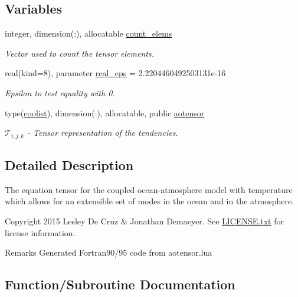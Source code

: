 \subsection*{Variables}
\begin{DoxyCompactItemize}
\item 
integer, dimension(\+:), allocatable \hyperlink{namespaceaotensor__def_aa9e30c84efc5a81409ba9c0286c87eac}{count\+\_\+elems}
\begin{DoxyCompactList}\small\item\em Vector used to count the tensor elements. \end{DoxyCompactList}\item 
real(kind=8), parameter \hyperlink{namespaceaotensor__def_ab1cf9313fb1def1a17de539cfa922e35}{real\+\_\+eps} = 2.\+2204460492503131e-\/16
\begin{DoxyCompactList}\small\item\em Epsilon to test equality with 0. \end{DoxyCompactList}\item 
type(\hyperlink{structtensor_1_1coolist}{coolist}), dimension(\+:), allocatable, public \hyperlink{namespaceaotensor__def_a0dc43bc9294a18f2fe57b67489f1702f}{aotensor}
\begin{DoxyCompactList}\small\item\em $\mathcal{T}_{i,j,k}$ -\/ Tensor representation of the tendencies. \end{DoxyCompactList}\end{DoxyCompactItemize}


\subsection{Detailed Description}
The equation tensor for the coupled ocean-\/atmosphere model with temperature which allows for an extensible set of modes in the ocean and in the atmosphere. 

\begin{DoxyCopyright}{Copyright}
2015 Lesley De Cruz \& Jonathan Demaeyer. See \hyperlink{LICENSE_8txt}{L\+I\+C\+E\+N\+S\+E.\+txt} for license information. 
\end{DoxyCopyright}
\begin{DoxyRemark}{Remarks}
Generated Fortran90/95 code from aotensor.\+lua 
\end{DoxyRemark}


\subsection{Function/\+Subroutine Documentation}
